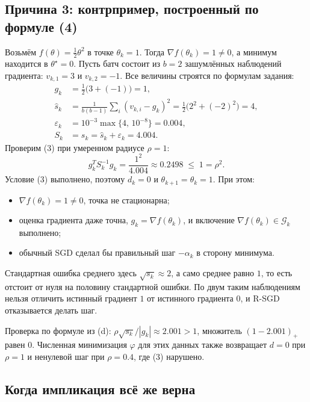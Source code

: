 \documentclass[11pt,a4paper]{article}
\newcommand{\G}{\mathcal{G}_k}
\begin{document}
\subsection*{Причина 3: контрпример, построенный по формуле (4)}

Возьмём $f(\theta) = \tfrac12\theta^2$ в точке $\theta_k = 1$. Тогда
$\nabla f(\theta_k) = 1 \ne 0$, а минимум находится в $\theta^\star = 0$. Пусть батч
состоит из $b = 2$ зашумлённых наблюдений градиента: $v_{k,1} = 3$ и
$v_{k,2} = -1$. Все величины строятся по формулам задания:
\begin{align*}
g_k &= \tfrac12\big(3 + (-1)\big) = 1,\\
\widehat s_k &= \frac{1}{b(b-1)}\sum_i (v_{k,i} - g_k)^2
= \frac{1}{2}\big(2^2 + (-2)^2\big) = 4,\\
\varepsilon_k &= 10^{-3}\max\{4,\,10^{-8}\} = 0.004,\\
S_k &= s_k = \widehat s_k + \varepsilon_k = 4.004 .
\end{align*}
Проверим (3) при умеренном радиусе $\rho = 1$:
\begin{equation*}
g_k^TS_k^{-1}g_k = \frac{1^2}{4.004} \approx 0.2498 \;\le\; 1 = \rho^2 .
\end{equation*}
Условие (3) выполнено, поэтому $d_k = 0$ и $\theta_{k+1} = \theta_k = 1$. При этом:
\begin{itemize}
\item $\nabla f(\theta_k) = 1 \ne 0$, точка не стационарна;
\item оценка градиента даже точна, $g_k = \nabla f(\theta_k)$, и включение
$\nabla f(\theta_k) \in \G$ выполнено;
\item обычный SGD сделал бы правильный шаг $-\alpha_k$ в сторону минимума.
\end{itemize}

Стандартная ошибка среднего здесь $\sqrt{s_k} \approx 2$, а само среднее равно $1$,
то есть отстоит от нуля на половину стандартной ошибки. По двум таким наблюдениям
нельзя отличить истинный градиент $1$ от истинного градиента $0$, и R-SGD
отказывается делать шаг.

Проверка по формуле из (d): $\rho\sqrt{s_k}/|g_k| \approx 2.001 > 1$, множитель
$(1 - 2.001)_+$ равен $0$. Численная минимизация $\varphi$ для этих данных также
возвращает $d = 0$ при $\rho = 1$ и ненулевой шаг при $\rho = 0.4$, где (3)
нарушено.

\subsection*{Когда импликация всё же верна}
\end{document}

